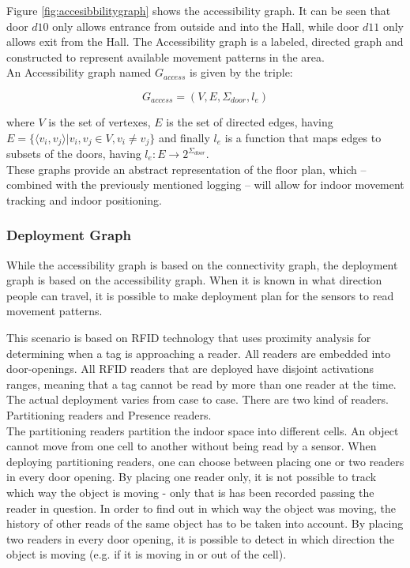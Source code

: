Figure \ref{fig:accesibbilitygraph} shows the accessibility graph.
It can be seen that door $d10$ only allows entrance from outside and into the Hall, while door $d11$ only allows exit from the Hall.
The Accessibility graph is a labeled, directed graph and constructed to represent available movement patterns in the area. \\

An Accessibility graph named $G_{access}$ is given by the triple: 

\begin{equation}
G_{access} = (V, E, \Sigma_{door}, l_e)
\end{equation} 

where $V$ is the set of vertexes, $E$ is the set of directed edges, having $E = \{\langle v_i, v_j \rangle | v_i, v_j \in V,  v_i \not= v_j\}$ and finally $l_e$ is a function that maps edges to subsets of the doors, having $l_e : E \rightarrow 2^{\Sigma_{door}}$. \\

These graphs provide an abstract representation of the floor plan, which -- combined with the previously mentioned logging -- will allow for indoor movement tracking and indoor positioning. 

\subsubsection{ \quad Deployment Graph}
While the accessibility graph is based on the connectivity graph, the deployment graph is based on the accessibility graph. 
When it is known in what direction people can travel, it is possible to make deployment plan for the sensors to read movement patterns. 

This scenario is based on RFID technology that uses proximity analysis for determining when a tag is approaching a reader. 
All readers are embedded into door-openings. 
All RFID readers that are deployed have disjoint activations ranges, meaning that a tag cannot be read by more than one reader at the time. \\

The actual deployment varies from case to case. 
There are two kind of readers. Partitioning readers and Presence readers. \\

The partitioning readers partition the indoor space into different cells. 
An object cannot move from one cell to another without being read by a sensor. 
When deploying partitioning readers, one can choose between placing one or two readers in every door opening. 
By placing one reader only, it is not possible to track which way the object is moving - only that is has been recorded passing the reader in question. 
In order to find out in which way the object was moving, the history of other reads of the same object has to be taken into account. 
By placing two readers in every door opening, it is possible to detect in which direction the object is moving (e.g. if it is moving in or out of the cell). \\

